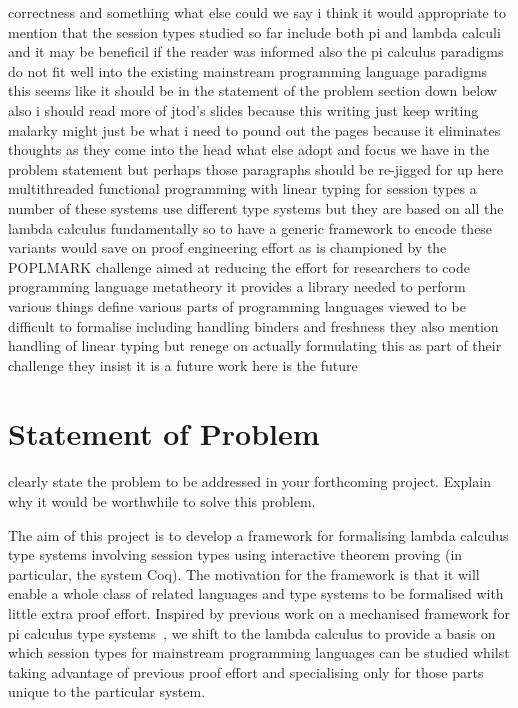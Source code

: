 \documentclass{mprop}
\begin{document}
correctness and something what else could we say i think it would appropriate
to mention that the session types studied so far include both pi and lambda
calculi and it may be beneficil if the reader was informed also the pi
calculus paradigms do not fit well into the existing mainstream programming
language paradigms this seems like it should be in the statement of the problem section down below also i should read more of jtod's slides because this writing just keep writing malarky might just be what i need to pound out the pages because it eliminates thoughts as they come into the head what else adopt and focus we have in the problem statement but perhaps those paragraphs should be re-jigged for up here multithreaded functional programming with linear typing for session types a number of these systems use different type systems but they are based on all the lambda calculus fundamentally so to have a generic framework to encode these variants would save on proof engineering effort as is championed by the POPLMARK challenge aimed at reducing the effort for researchers to code programming language metatheory it provides a library needed to perform various things define various parts of programming languages viewed to be difficult to formalise including handling binders and freshness they also mention handling of linear typing but renege on actually formulating this as part of their challenge they insist it is a future work here is the future


\section{Statement of Problem}

clearly state the problem to be addressed in your forthcoming project. Explain
why it would be worthwhile to solve this problem.

The aim of this project is to develop a framework for formalising lambda
calculus type systems involving session types using interactive theorem
proving (in particular, the system Coq). The motivation for the framework is
that it will enable a whole class of related languages and type systems to be
formalised with little extra proof effort. Inspired by previous work on a
mechanised framework for pi calculus type systems~\cite{Gay:2001:FFP}, we
shift to the lambda calculus to provide a basis on which session types for
mainstream programming languages can be studied whilst taking advantage of
previous proof effort and specialising only for those parts unique to the
particular system.
\end{document}
